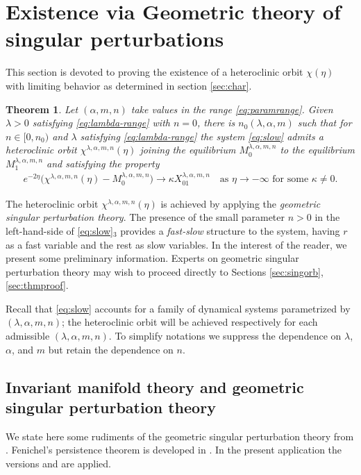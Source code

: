 \documentclass[11pt]{article}
\newtheorem{theorem}{Theorem}
\theoremstyle{remark}
\begin{document}
\section{Existence via Geometric theory of singular perturbations} \label{sec:proof}
This section is devoted to proving the existence of a heteroclinic orbit $\chi(\eta)$ with limiting behavior as determined in  section \ref{sec:char}.

\begin{theorem} \label{thm1}
Let $(\alpha,m,n)$ take values in the range \eqref{eq:paramrange}.
Given $\lambda > 0$ satisfying \eqref{eq:lambda-range} with $n=0$, there is
$n_0( \lambda,\alpha,m)$ such that for $n \in [0, n_0)$ and  $\lambda$ satisfying \eqref{eq:lambda-range} the
system \eqref{eq:slow}  admits a heteroclinic orbit $\chi^{\lambda,\alpha,m,n}(\eta)$ joining the equilibrium $M_0^{\lambda,\alpha,m,n}$ to the equilibrium $M_1^{\lambda,\alpha,m,n}$ and satisfying the property
    \begin{align}
     \label{eq:rapid}
        e^{-2\eta}\big(\chi^{\lambda,\alpha,m,n}(\eta) - M_0^{\lambda,\alpha,m,n}\big) \rightarrow \kappa X_{01}^{\lambda,\alpha,m,n} \quad \text{as $\eta \rightarrow -\infty$ for some $\kappa\ne0$}.
    \end{align}
\end{theorem}

The heteroclinic orbit $\chi^{\lambda,\alpha,m,n}(\eta)$ is achieved by applying the {\it geometric singular perturbation theory}. The presence of the small parameter $n>0$ in the left-hand-side of \eqref{eq:slow}$_3$ provides a {\it fast-slow} structure to the system, having $r$ as a fast variable and the rest as slow variables.
In the interest of the reader, we present some preliminary information. Experts on geometric singular
perturbation theory may wish to proceed directly to Sections \ref{sec:singorb}, \ref{sec:thmproof}.

Recall that \eqref{eq:slow} accounts for a family of dynamical systems parametrized by $(\lambda,\alpha,m,n)$; the heteroclinic orbit will be achieved respectively for each admissible $(\lambda,\alpha,m,n)$. To simplify notations we suppress the dependence on $\lambda$, $\alpha$, and $m$ but retain
the dependence on $n$.

\subsection{Invariant manifold theory and geometric singular perturbation theory}\label{sec:singpert}
We state here some rudiments of the geometric singular perturbation theory from \cite{fenichel_asymptotic_1977,fenichel_geometric_1979}. %
Fenichel's persistence theorem is developed in \cite[Theorem 9.1]{fenichel_geometric_1979}. In the present application the versions \cite[Theorem 2.2]{Sz1991} and \cite[Theorem 3.1]{Sz1991} are applied.
\end{document}
